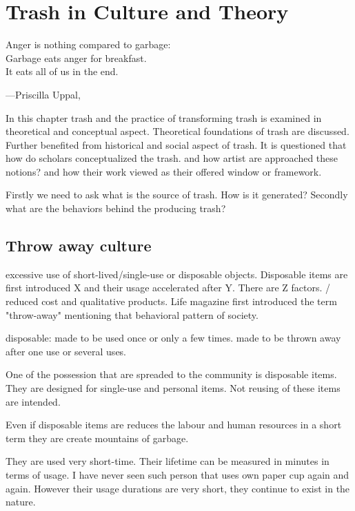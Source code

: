 \chapter{Trash in Culture and Theory}

\epigraph{Anger is nothing compared to garbage:\\ Garbage eats anger for breakfast.\\ It eats all of us in the end.}{\hfill---Priscilla Uppal, }

In this chapter trash and the practice of transforming trash is examined in theoretical and conceptual aspect. Theoretical foundations of trash are discussed. Further benefited from historical and social aspect of trash. It is questioned that how do scholars conceptualized the trash.  and how artist are approached these notions? and how their work viewed as their offered window or framework.

Firstly we need to ask what is the source of trash. How is it generated? Secondly what are the behaviors behind the producing trash?

\section{Throw away culture}


excessive use of short-lived/single-use or disposable objects. Disposable items are first introduced X and their usage accelerated after Y. There are Z factors. / reduced cost and qualitative products. Life magazine first introduced the term "throw-away" mentioning that behavioral pattern of society.

disposable: made to be used once or only a few times. made to be thrown away after one use or several uses.

One of the possession that are spreaded to the community is disposable items. They are designed for single-use and personal items. Not reusing of these items are intended. 

Even if disposable items are reduces the labour and human resources in a short term they are create mountains of garbage. 

They are used very short-time. Their lifetime can be measured in minutes in terms of usage. I have never seen such person that uses own paper cup again and again. However their usage durations are very short, they continue to exist in the nature. 

